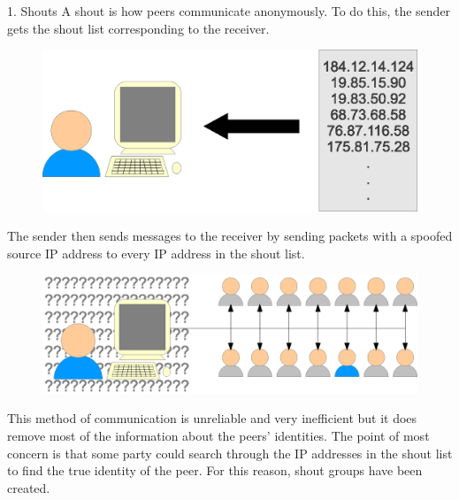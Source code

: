 \documentclass[ %
                    author={Luke Murray},
                supervisor={Dr. Simon Hollis},
                     title={Shadow Peer-to-Peer Networks},
                  subtitle={},
                    degree={MEng},
                      year={2013} ]{poster}
\begin{document}
\begin{frame}{}
\begin{columns}[t]
    \begin{column}{0.422\linewidth}
    \begin{block}{\normalsize 1. Shouts}
    \small A shout is how peers communicate anonymously. To do this, the sender gets the shout list corresponding to the receiver.
    \begin{figure}[h]
        \includegraphics{diagrams/poster_get_list.eps}
    \end{figure}
    The sender then sends messages to the receiver by sending packets with a spoofed source IP address to every IP address in the shout list.
    \begin{figure}[h]
        \includegraphics{diagrams/poster_d2.eps}
    \end{figure}
    This method of communication is unreliable and very inefficient but it does remove most of the information about the peers' identities. The point of most concern is that some party could search through the IP addresses in the shout list to find the true identity of the peer. For this reason, shout groups have been created.
    \end{block}
    \end{column}


\end{columns}
\end{frame}
\end{document}
